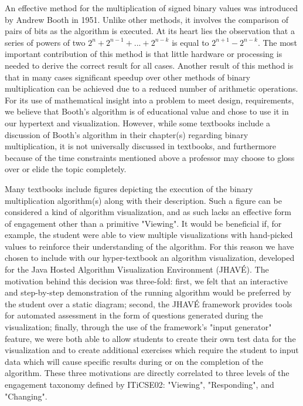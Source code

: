 \documentclass{acm_proc_article-sp}
\begin{document}
An effective method for the multiplication of signed binary values was introduced by Andrew Booth in 1951.
Unlike other methods, it involves the comparison of pairs of bits as the algorithm is executed.
At its heart lies the observation that a series of powers of two $2^n + 2^{n-1} + ...
+ 2^{n-k}$ is equal to $2^{n+1} - 2^{n-k}$.
The most important contribution of this method is that little hardware or processing is needed to derive the correct result for all cases\cite{booth}.
Another result of this method is that in many cases significant speedup over other methods of binary multiplication can be achieved due to a reduced number of arithmetic operations.\cite{needsCitation}
For its use of mathematical insight into a problem to meet design, requirements, we believe that Booth's algorithm is of educational value and chose to use it in our hypertext and visualization.
However, while some textbooks include a discussion of Booth's algorithm in their chapter(s) regarding binary multiplication, it is not universally discussed in textbooks, and furthermore because of the time constraints mentioned above a professor may choose to gloss over or elide the topic completely.

Many textbooks include figures depicting the execution of the binary multiplication algorithm(s) along with their description\cite{needsCitation}.
Such a figure can be considered a kind of algorithm visualization, and as such lacks an effective form of engagement other than a primitive "Viewing".
It would be beneficial if, for example, the student were able to view multiple visualizations with hand-picked values to reinforce their understanding of the algorithm.
For this reason we have chosen to include with our hyper-textbook an algorithm visualization, developed for the Java Hosted Algorithm Visualization Environment (JHAVÉ)\cite{JHAVE}.
The motivation behind this decision was three-fold: first, we felt that an interactive and step-by-step demonstration of the running algorithm would be preferred by the student over a static diagram; second, the JHAVÉ framework provides tools for automated assessment in the form of questions generated during the visualization; finally, through the use of the framework's "input generator" feature, we were both able to allow students to create their own test data for the visualization and to create additional exercises which require the student to input data which will cause specific results during or on the completion of the algorithm.
These three motivations are directly correlated to three levels of the engagement taxonomy defined by ITiCSE02: "Viewing", "Responding", and "Changing".
\end{document}
